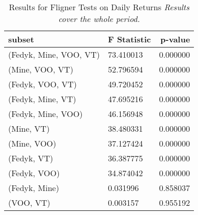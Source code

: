 \begin{appendices}
\begin{table}[ht]
\centering
\caption{Results for Fligner Tests on Daily Returns
\newline \footnotesize{\textit{Results cover the whole period.}}}
    \begin{tabular}{l|ll}
    \toprule
    \textbf{subset}        & \multicolumn{1}{r}{\textbf{F Statistic}} & \multicolumn{1}{r}{\textbf{p-value}} \\ \midrule
    (Fedyk, Mine, VOO, VT)              & 73.410013                      & 0.000000                       \\
    (Mine, VOO, VT)                     & 52.796594                      & 0.000000                       \\
    (Fedyk, VOO, VT)                    & 49.720452                      & 0.000000                       \\
    (Fedyk, Mine, VT)                   & 47.695216                      & 0.000000                       \\
    (Fedyk, Mine, VOO)                  & 46.156948                      & 0.000000                       \\
    (Mine, VT)                          & 38.480331                      & 0.000000                       \\
    (Mine, VOO)                         & 37.127424                      & 0.000000                       \\
    (Fedyk, VT)                         & 36.387775                      & 0.000000                       \\
    (Fedyk, VOO)                        & 34.874042                      & 0.000000                       \\
    (Fedyk, Mine)                       & 0.031996                       & 0.858037                       \\
    (VOO, VT)                           & 0.003157                       & 0.955192                      
    \end{tabular}
\label{tab:fligner_all}
\end{table}


\end{appendices}
